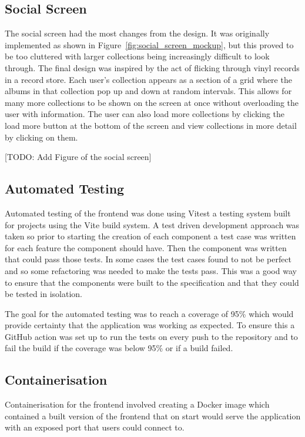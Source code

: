 \subsection{Social Screen}
The social screen had the most changes from the design. It was originally implemented as shown in Figure~\ref{fig:social_screen_mockup}, but this proved to be too cluttered with larger collections being increasingly difficult to look through. The final design was inspired by the act of flicking through vinyl records in a record store. Each user's collection appears as a section of a grid where the albums in that collection pop up and down at random intervals. This allows for many more collections to be shown on the screen at once without overloading the user with information. The user can also load more collections by clicking the load more button at the bottom of the screen and view collections in more detail by clicking on them.

[TODO: Add Figure of the social screen]

\subsection{Automated Testing}
Automated testing of the frontend was done using Vitest a testing system built for projects using the Vite build system. A test driven development approach was taken so prior to starting the creation of each component a test case was written for each feature the component should have. Then the component was written that could pass those tests. In some cases the test cases found to not be perfect and so some refactoring was needed to make the tests pass. This was a good way to ensure that the components were built to the specification and that they could be tested in isolation.

The goal for the automated testing was to reach a coverage of 95\% which would provide certainty that the application was working as expected. To ensure this a GitHub action was set up to run the tests on every push to the repository and to fail the build if the coverage was below 95\% or if a build failed.

\subsection{Containerisation}
Containerisation for the frontend involved creating a Docker image which contained a built version of the frontend that on start would serve the application with an exposed port that users could connect to.

